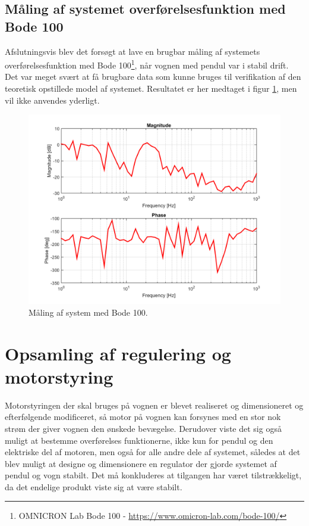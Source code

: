 \subsection{Måling af systemet overførelsesfunktion med Bode 100}
Afslutningsvis blev det forsøgt at lave en brugbar måling af systemets overførelsesfunktion med Bode 100\footnote{OMNICRON Lab Bode 100 - \url{https://www.omicron-lab.com/bode-100/}}, når vognen med pendul var i stabil drift.
Det var meget svært at få brugbare data som kunne bruges til verifikation af den teoretisk opstillede model af systemet.
Resultatet er her medtaget i figur \ref{fig:bode100}, men vil ikke anvendes yderligt.
\begin{figure}[h!]
	\centering
	\includegraphics[width=.8\textwidth]{billeder/bode100.png}
	\caption{Måling af system med Bode 100.}
	\label{fig:bode100}
\end{figure}

\section{Opsamling af regulering og motorstyring}
Motorstyringen der skal bruges på vognen er blevet realiseret og dimensioneret og efterfølgende modificeret, så motor på vognen kan forsynes med en stor nok strøm der giver vognen den ønskede bevægelse.
Derudover viste det sig også muligt at bestemme overførelses funktionerne, ikke kun for pendul og den elektriske del af motoren, men også for alle andre dele af systemet, således at det blev muligt at designe og dimensionere en regulator der gjorde systemet af pendul og vogn stabilt.
Det må konkluderes at tilgangen har været tilstrækkeligt, da det endelige produkt viste sig at være stabilt.




